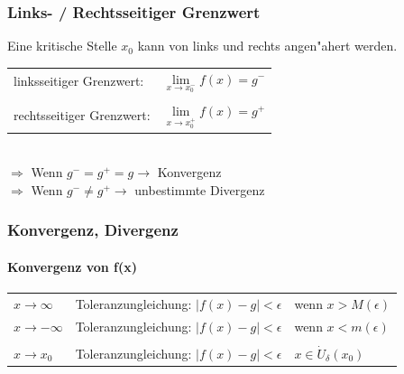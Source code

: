 			
			\subsubsection{Links- / Rechtsseitiger Grenzwert}
			Eine kritische Stelle $x_0$ 	kann von links und rechts angen"ahert werden. \\
			
			\begin{tabular}{ll}
			linksseitiger Grenzwert: & $\lim\limits_{x \to x_0^-} f(x) = g^-$ \\
			\\
			rechtsseitiger Grenzwert: & $\lim\limits_{x \to x_0^+} f(x) = g^+$ \\
			\end{tabular}
			\\ 
			$\Rightarrow$ Wenn $g^- = g^+ = g \rightarrow$ Konvergenz  \\
			$\Rightarrow$ Wenn $g^- \neq g^+ \rightarrow$ unbestimmte Divergenz \\


			\subsubsection{Konvergenz, Divergenz}	
				\paragraph{Konvergenz von f(x)}
			
			\begin{tabular}{lll}
			$x \rightarrow \infty$ & Toleranzungleichung: $\vert f(x) - g \vert < \epsilon$ & wenn $x > M(\epsilon)$ \\
			$x \rightarrow -\infty$ & Toleranzungleichung: $\vert f(x) - g \vert < \epsilon$ & wenn $x < m(\epsilon)$ \\
			\\
			$x \rightarrow x_0$ & Toleranzungleichung:  $\vert f(x) - g \vert < \epsilon$ & $ x \in \dot{U}_\delta(x_0)$ \\
			\end{tabular}

			
